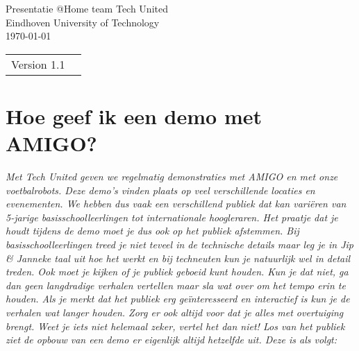 \documentclass[a4paper,10pt]{article}
\numberwithin{equation}{section}
\numberwithin{figure}{section}
\numberwithin{table}{section}
\begin{document}
\begin{titlepage}

\begin{center}
\vspace{15mm}
\end{center}

\begin{figure}[H]
\centering
\end{figure}

\begin{center}
\vspace{10mm}
{\Huge Presentatie @Home team Tech United}\\
\vspace{3mm}
{\Large Eindhoven University of Technology}\\
\vspace{10mm}
\vspace{3mm}
\today
\end{center}

\vfill


\begin{tabular}{l l}
Version 1.1\\
\end{tabular}

\end{titlepage}

\section*{Hoe geef ik een demo met AMIGO?}
\textit{Met Tech United geven we regelmatig demonstraties met AMIGO en met onze voetbalrobots. Deze demo’s vinden plaats op veel verschillende locaties en evenementen. We hebben dus vaak een verschillend publiek dat kan vari\"eren van 5-jarige basisschoolleerlingen tot internationale hoogleraren. Het praatje dat je houdt tijdens de demo moet je dus ook op het publiek afstemmen. Bij basisschoolleerlingen treed je niet teveel in de technische details maar leg je in Jip \& Janneke taal uit hoe het werkt en bij techneuten kun je natuurlijk wel in detail treden. Ook moet je kijken of je publiek geboeid kunt houden. Kun je dat niet, ga dan geen langdradige verhalen vertellen maar sla wat over om het tempo erin te houden. Als je merkt dat het publiek erg geïnteresseerd en interactief is kun je de verhalen wat langer houden. Zorg er ook altijd voor dat je alles met overtuiging brengt. Weet je iets niet helemaal zeker, vertel het dan niet! Los van het publiek ziet de opbouw van een demo er eigenlijk altijd hetzelfde uit. Deze is als volgt:}
\end{document}
